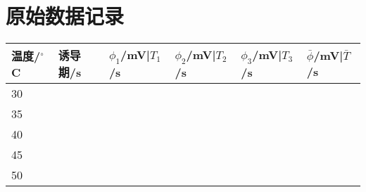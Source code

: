 \documentclass[a4paper]{article}
\begin{document}
\section{原始数据记录}
\begin{table}[H]
	\begin{center}
		\begin{tabular}{l|l|l|l|l|l}
			\hline
			温度/$^\circ$C&  诱导期/s&  $\phi_1$/mV|$T_{1}$/s & $\phi_2$/mV|$T_{2}$/s & $\phi_3$/mV|$T_{3}$/s & $\bar{\phi}$/mV|$\bar{T}$/s\\
			\hline
			30&  &  &  &  &  \\
			\hline
			35&  &  &  &  &  \\
			\hline
			40&  &  &  &  &  \\
			\hline
			45&  &  &  &  &  \\
			\hline
			50&  &  &  &  &  \\
			\hline
		 \end{tabular}
	\end{center}
\end{table}
\end{document}
